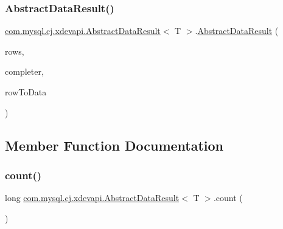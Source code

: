 \subsubsection{\texorpdfstring{Abstract\+Data\+Result()}{AbstractDataResult()}}
{\footnotesize\ttfamily \mbox{\hyperlink{classcom_1_1mysql_1_1cj_1_1xdevapi_1_1_abstract_data_result}{com.\+mysql.\+cj.\+xdevapi.\+Abstract\+Data\+Result}}$<$ T $>$.\mbox{\hyperlink{classcom_1_1mysql_1_1cj_1_1xdevapi_1_1_abstract_data_result}{Abstract\+Data\+Result}} (\begin{DoxyParamCaption}\item[{\mbox{\hyperlink{interfacecom_1_1mysql_1_1cj_1_1result_1_1_row_list}{Row\+List}}}]{rows,  }\item[{Supplier$<$ \mbox{\hyperlink{classcom_1_1mysql_1_1cj_1_1protocol_1_1x_1_1_statement_execute_ok}{Statement\+Execute\+Ok}} $>$}]{completer,  }\item[{\mbox{\hyperlink{interfacecom_1_1mysql_1_1cj_1_1protocol_1_1_protocol_entity_factory}{Protocol\+Entity\+Factory}}$<$ T, \mbox{\hyperlink{classcom_1_1mysql_1_1cj_1_1protocol_1_1x_1_1_x_message}{X\+Message}} $>$}]{row\+To\+Data }\end{DoxyParamCaption})}



\subsection{Member Function Documentation}
\mbox{\label{classcom_1_1mysql_1_1cj_1_1xdevapi_1_1_abstract_data_result_a7825d8f19a7fd60da5c89755219a22d2}} 
\subsubsection{\texorpdfstring{count()}{count()}}
{\footnotesize\ttfamily long \mbox{\hyperlink{classcom_1_1mysql_1_1cj_1_1xdevapi_1_1_abstract_data_result}{com.\+mysql.\+cj.\+xdevapi.\+Abstract\+Data\+Result}}$<$ T $>$.count (\begin{DoxyParamCaption}{ }\end{DoxyParamCaption})}

\mbox{\label{classcom_1_1mysql_1_1cj_1_1xdevapi_1_1_abstract_data_result_aa0376cefb0ca352d431b392149481588}} 
